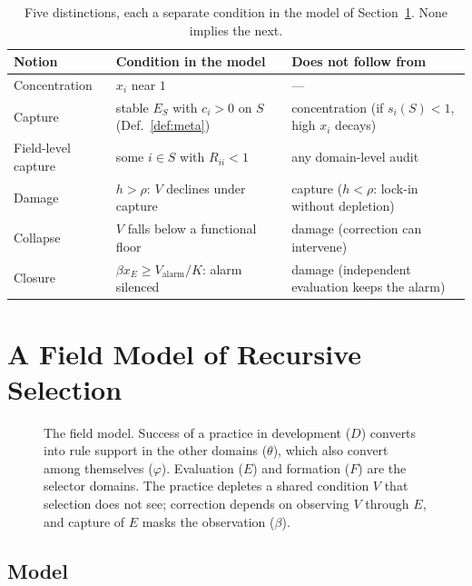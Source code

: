 \documentclass[letterpaper]{article} %
\theoremstyle{definition}
\begin{document}
\begin{table}[t]
\centering
\small
\setlength{\tabcolsep}{3pt}
\begin{tabular}{@{}>{\raggedright\arraybackslash}p{1.85cm}>{\raggedright\arraybackslash}p{2.95cm}>{\raggedright\arraybackslash}p{2.7cm}@{}}
\toprule
Notion & Condition in the model & Does not follow from \\
\midrule
Concentration & $x_i$ near $1$ & --- \\
Capture & stable $E_S$ with $c_i>0$ on $S$ (Def.~\ref{def:meta}) & concentration (if $s_i(S)<1$, high $x_i$ decays) \\
Field-level capture & some $i\in S$ with $R_{ii}<1$ & any domain-level audit \\
Damage & $h>\rho$: $V$ declines under capture & capture ($h<\rho$: lock-in without depletion) \\
Collapse & $V$ falls below a functional floor & damage (correction can intervene) \\
Closure & $\beta x_E\ge V_{\mathrm{alarm}}/K$: alarm silenced & damage (independent evaluation keeps the alarm) \\
\bottomrule
\end{tabular}
\caption{Five distinctions, each a separate condition in the model of Section~\ref{sec:model}. None implies the next.}
\label{tab:distinctions}
\end{table}

\section{A Field Model of Recursive Selection}\label{sec:model}

\begin{figure}[t]
\centering

\caption{The field model. Success of a practice in development ($D$) converts into rule support in the other domains ($\theta$), which also convert among themselves ($\varphi$). Evaluation ($E$) and formation ($F$) are the selector domains. The practice depletes a shared condition $V$ that selection does not see; correction depends on observing $V$ through $E$, and capture of $E$ masks the observation ($\beta$).}
\label{fig:schematic}
\end{figure}

\subsection{Model}
\end{document}
